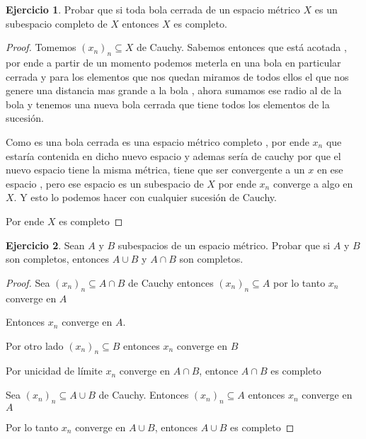 \documentclass[11pt]{report}
\theoremstyle{definition}
\newtheorem{ej}{Ejercicio}
\begin{document}
\begin{ej}
	Probar que si toda bola cerrada de un espacio métrico $X$ es un subespacio completo de $X$ entonces $X$ es completo.

	\begin{proof}
		Tomemos $(x_n)_n \subseteq X$ de Cauchy. Sabemos entonces que está acotada , por ende a partir de un momento podemos meterla en una bola en particular cerrada y para los elementos que nos quedan miramos de todos ellos el que nos genere una distancia mas grande a la bola , ahora sumamos ese radio al de la bola y tenemos una nueva bola cerrada que tiene todos los elementos de la sucesión.

		Como es una bola cerrada es una espacio métrico completo , por ende $x_n$ que estaría contenida en dicho nuevo espacio y ademas sería de cauchy por que el nuevo espacio tiene la misma métrica, tiene que ser convergente a un $x$ en ese espacio , pero ese espacio es un subespacio de $X$ por ende $x_n$ converge a algo en $X$. Y esto lo podemos hacer con cualquier sucesión de Cauchy.

		Por ende $X$ es completo
	\end{proof}
\end{ej}
	\begin{ej}
		Sean $A$ y $B$ subespacios de un espacio métrico. Probar que si $A$ y $B$ son completos, entonces $A \cup B$ y $A \cap B$ son completos.
		\begin{proof}
			Sea $(x_n)_n \subseteq A\cap B$ de Cauchy entonces $(x_n)_n \subseteq A$ por lo tanto $x_n$ converge en $A$

			Entonces $x_n$ converge en $A$.

			Por otro lado $(x_n)_n \subseteq B$ entonces $x_n$ converge en $B$

			Por unicidad de límite $x_n$ converge en $A \cap B$, entonce $A \cap B$ es completo

			Sea $(x_n)_n \subseteq A\cup B$ de Cauchy. Entonces $(x_n)_n \subseteq A$ entonces $x_n$ converge en $A$

			Por lo tanto $x_n$ converge en $A \cup B$, entonces $A \cup B$ es completo
		\end{proof}
	\end{ej}
	
\end{document}
